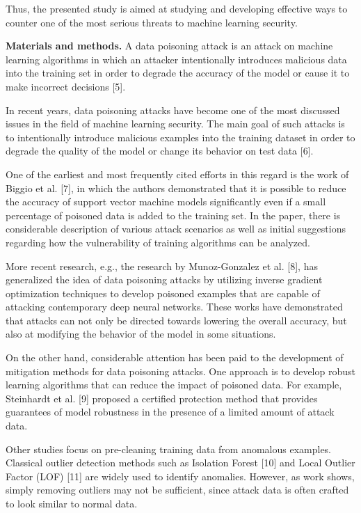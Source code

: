 \begin{multicols}{2}
Thus, the presented study is aimed at studying and developing effective
ways to counter one of the most serious threats to machine learning
security.

{\bfseries Materials and methods.} A data poisoning attack is an attack on
machine learning algorithms in which an attacker intentionally
introduces malicious data into the training set in order to degrade the
accuracy of the model or cause it to make incorrect decisions {[}5{]}.

In recent years, data poisoning attacks have become one of the most
discussed issues in the field of machine learning security. The main
goal of such attacks is to intentionally introduce malicious examples
into the training dataset in order to degrade the quality of the model
or change its behavior on test data {[}6{]}.

One of the earliest and most frequently cited efforts in this regard is
the work of Biggio et al. {[}7{]}, in which the authors demonstrated
that it is possible to reduce the accuracy of support vector machine
models significantly even if a small percentage of poisoned data is
added to the training set. In the paper, there is considerable
description of various attack scenarios as well as initial suggestions
regarding how the vulnerability of training algorithms can be analyzed.

More recent research, e.g., the research by Munoz-Gonzalez et al.
{[}8{]}, has generalized the idea of data poisoning attacks by utilizing
inverse gradient optimization techniques to develop poisoned examples
that are capable of attacking contemporary deep neural networks. These
works have demonstrated that attacks can not only be directed towards
lowering the overall accuracy, but also at modifying the behavior of the
model in some situations.

On the other hand, considerable attention has been paid to the
development of mitigation methods for data poisoning attacks. One
approach is to develop robust learning algorithms that can reduce the
impact of poisoned data. For example, Steinhardt et al. {[}9{]} proposed
a certified protection method that provides guarantees of model
robustness in the presence of a limited amount of attack data.

Other studies focus on pre-cleaning training data from anomalous
examples. Classical outlier detection methods such as Isolation Forest
{[}10{]} and Local Outlier Factor (LOF) {[}11{]} are widely used to
identify anomalies. However, as work shows, simply removing outliers may
not be sufficient, since attack data is often crafted to look similar to
normal data.


\end{multicols}

